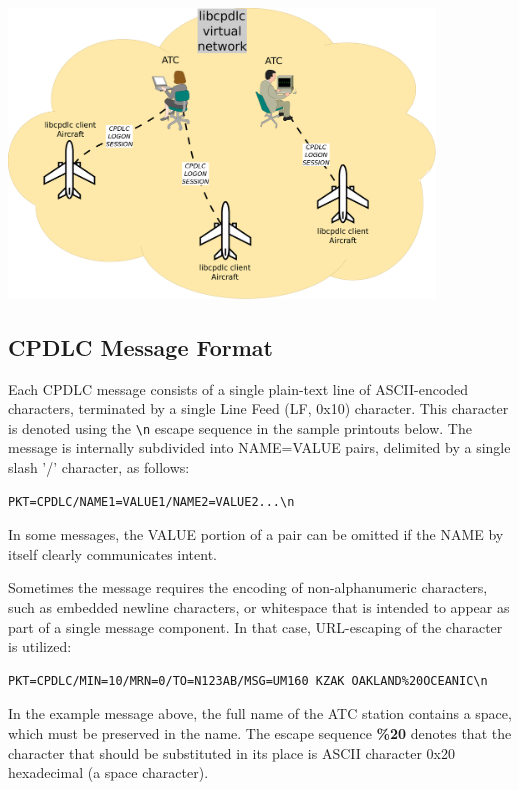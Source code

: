\documentclass[a4paper,12pt]{article}
\begin{document}
\begin{center}
\includegraphics[width=0.85\textwidth]{virt_net.png}
\end{center}

\subsection{CPDLC Message Format}

Each CPDLC message consists of a single plain-text line of ASCII-encoded
characters, terminated by a single Line Feed (LF, 0x10) character. This
character is denoted using the \texttt{\textbackslash n} escape sequence
in the sample printouts below. The message is internally subdivided into
NAME=VALUE pairs, delimited by a single slash '/' character, as follows:

\begin{verbatim}
PKT=CPDLC/NAME1=VALUE1/NAME2=VALUE2...\n
\end{verbatim}

\noindent In some messages, the VALUE portion of a pair can be omitted if
the NAME by itself clearly communicates intent.

Sometimes the message requires the encoding of non-alphanumeric
characters, such as embedded newline characters, or whitespace that
is intended to appear as part of a single message component. In that
case, URL-escaping of the character is utilized:

\begin{verbatim}
PKT=CPDLC/MIN=10/MRN=0/TO=N123AB/MSG=UM160 KZAK OAKLAND%20OCEANIC\n
\end{verbatim}

\noindent In the example message above, the full name of the ATC station
contains a space, which must be preserved in the name. The escape
sequence \textbf{\%20} denotes that the character that should be
substituted in its place is ASCII character 0x20 hexadecimal (a space
character).
\end{document}
